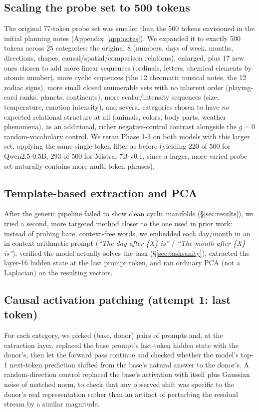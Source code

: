 \documentclass[11pt]{article}
\begin{document}
\subsection{Scaling the probe set to 500 tokens}
\label{sec:scale500method}
The original 77-token probe set was smaller than the 500 tokens envisioned
in the initial planning notes (Appendix~\ref{app:notes}). We expanded it to
exactly 500 tokens across 25 categories: the original 8 (numbers, days of
week, months, directions, shapes, causal/spatial/comparison relations),
enlarged, plus 17 new ones chosen to add more linear sequences (ordinals,
letters, chemical elements by atomic number), more cyclic sequences (the 12
chromatic musical notes, the 12 zodiac signs), more small closed enumerable
sets with no inherent order (playing-card ranks, planets, continents), more
scalar/intensity sequences (size, temperature, emotion intensity), and
several categories chosen to have \emph{no} expected relational structure at
all (animals, colors, body parts, weather phenomena), as an additional,
richer negative-control contrast alongside the $g{=}0$ random-vocabulary
control. We reran Phase 1-3 on both models with this larger set, applying
the same single-token filter as before (yielding 220 of 500 for Qwen2.5-0.5B,
293 of 500 for Mistral-7B-v0.1, since a larger, more varied probe set
naturally contains more multi-token phrases).

\subsection{Template-based extraction and PCA}
After the generic pipeline failed to show clean cyclic manifolds
(\S\ref{sec:results}), we tried a second, more targeted method closer to the
one used in prior work: instead of probing bare, context-free words, we
embedded each day/month in an in-context arithmetic prompt (\emph{``The day
after \{X\} is''} / \emph{``The month after \{X\} is''}), verified the model
actually solves the task (\S\ref{sec:tasksanity}), extracted the layer-16
hidden state at the last prompt token, and ran ordinary PCA (not a Laplacian)
on the resulting vectors.

\subsection{Causal activation patching (attempt 1: last token)}
For each category, we picked (base, donor) pairs of prompts and, at the
extraction layer, replaced the base prompt's last-token hidden state with the
donor's, then let the forward pass continue and checked whether the model's
top-1 next-token prediction shifted from the base's natural answer to the
donor's. A random-direction control replaced the base's activation with
itself plus Gaussian noise of matched norm, to check that any observed shift
was specific to the donor's real representation rather than an artifact of
perturbing the residual stream by a similar magnitude.
\end{document}
